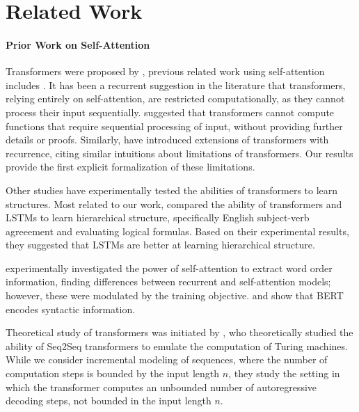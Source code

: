 \documentclass[11pt,a4paper]{article}
\begin{document}
\section{Related Work}\label{sec:related}
\paragraph{Prior Work on Self-Attention}
Transformers were proposed by \citet{vaswani2017attention}, previous related work using self-attention includes \citet{cheng2016long,parikh2016decomposable,paulus2017deep,lin2017structured}.
It has been a recurrent suggestion in the literature that transformers, relying entirely on self-attention, are restricted computationally, as they cannot process their input sequentially.
\citet{dehghani2018universal} suggested that %
transformers cannot compute functions that require sequential processing of input, without providing further details or proofs.
Similarly, \citet{shen2018disan,chen2018best,hao2019modeling} have introduced extensions of transformers with recurrence, citing similar intuitions about limitations of transformers.
Our results provide the first explicit formalization of these limitations.

Other studies have experimentally tested the abilities of transformers to learn structures.
Most related to our work, \citet{tran2018importance} compared the ability of transformers and LSTMs to learn hierarchical structure, specifically English subject-verb agreeement and evaluating logical formulas.
Based on their experimental results, they suggested that LSTMs are better at learning hierarchical structure.

\citet{yang2019assessing} experimentally investigated the power of self-attention to extract word order information, finding differences between recurrent and self-attention models; however, these were modulated by the training objective.
\citet{lin2019open} and \citet{tenney2019bert} show that BERT \cite{devlin2018bert} encodes syntactic information.

Theoretical study of transformers was initiated by \citet{perez2019turing}, who theoretically studied the ability of Seq2Seq transformers to emulate the computation of Turing machines.
While we consider incremental modeling of sequences, where the number of computation steps is bounded by the input length $n$, they study the setting in which the transformer computes an unbounded number of autoregressive decoding steps, not bounded in the input length $n$.
\end{document}
